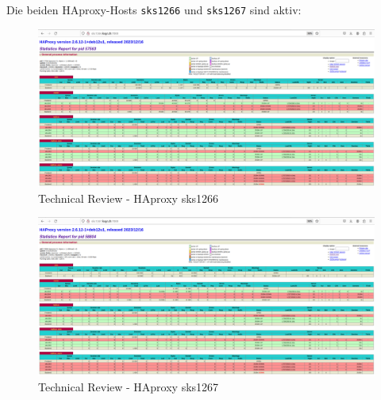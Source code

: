 \begin{flushleft}
    Die beiden HAproxy-Hosts \texttt{sks1266} und \texttt{sks1267} sind aktiv:
    \begin{figure}[H]
        \centering
        \includegraphics[width=1\linewidth]{source/implementation/construction_implementation/technical_review/haproxy_sks1266}
        \caption{Technical Review - HAproxy sks1266}
        \label{fig:haproxy_sks1266}
    \end{figure}
    \begin{figure}[H]
        \centering
        \includegraphics[width=1\linewidth]{source/implementation/construction_implementation/technical_review/haproxy_sks1267}
        \caption{Technical Review - HAproxy sks1267}
        \label{fig:haproxy_sks1267}
    \end{figure}
\end{flushleft}
